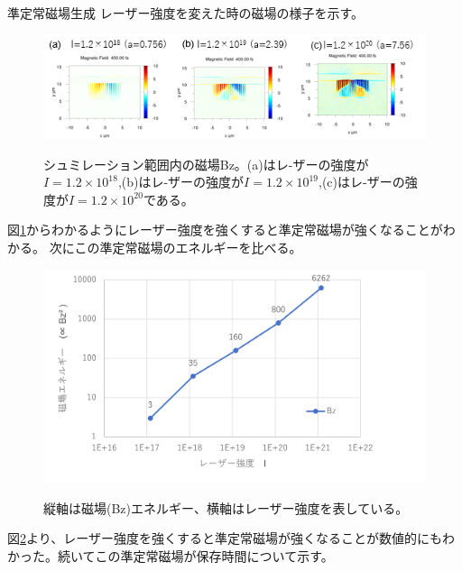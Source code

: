 \documentclass[a4paper,11pt,titlepage]{jarticle}
\numberwithin{equation}{section} %
\begin{document}
  {準定常磁場生成}
  レーザー強度を変えた時の磁場の様子を示す。
  
  \begin{figure}[H]
    \begin{center}
      \includegraphics[scale=1.2]{./image/4-23-10rod.png}
      \label{fig:4-4-15}
      \caption{シュミレーション範囲内の磁場Bz。(a)はレ-ザーの強度が$I=1.2 \times 10^{18}$,(b)はレ-ザーの強度が$I=1.2 \times 10^{19}$,(c)はレ-ザーの強度が$I=1.2 \times 10^{20}$である。}
    \end{center}
  \end{figure}
  
  図\ref*{fig:4-4-15}からわかるようにレーザー強度を強くすると準定常磁場が強くなることがわかる。
  次にこの準定常磁場のエネルギーを比べる。
  
  
  \begin{figure}[H]
    \begin{center}
      \includegraphics[scale=0.75]{./image/4-24-10rod.png}
      \label{fig:4-4-16}
      \caption{縦軸は磁場(Bz)エネルギー、横軸はレーザー強度を表している。}
    \end{center}
  \end{figure}
  
  図\ref*{fig:4-4-16}より、レーザー強度を強くすると準定常磁場が強くなることが数値的にもわかった。続いてこの準定常磁場が保存時間について示す。
  
\end{document}
